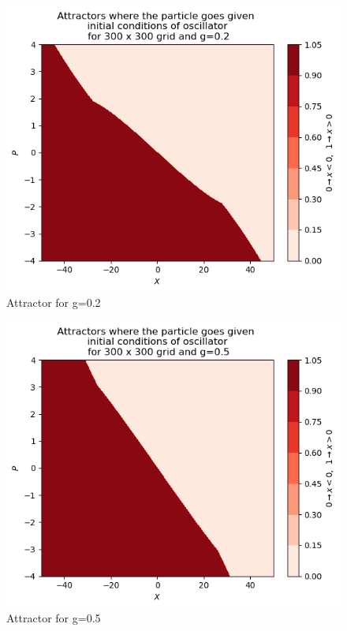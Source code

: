 \documentclass[idxtotoc,hyperref,openany]{labbook} %
\begin{document}
\begin{figure}[H] %
\begin{center}
\includegraphics[width=1\linewidth]{attractor013.png}
\end{center}
\caption{Attractor for g=0.2}
\label{Attractorg0-2}
\end{figure}

\begin{figure}[H] %
\begin{center}
\includegraphics[width=1\linewidth]{attractor016.png}
\end{center}
\caption{Attractor for g=0.5}
\label{Attractorg0-5}
\end{figure}
\end{document}
